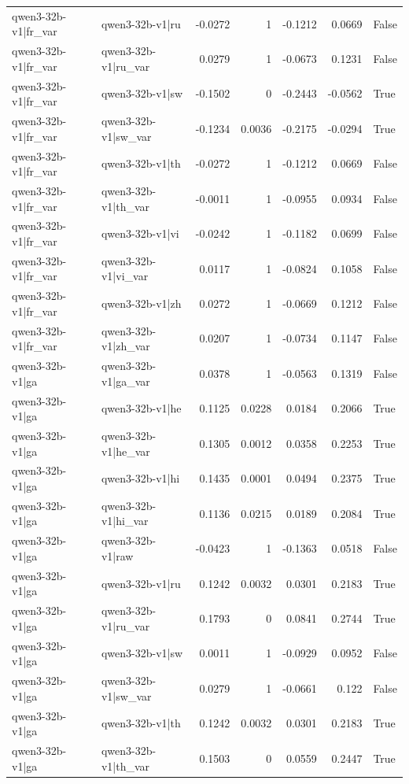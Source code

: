 \begin{table}
\begin{tabular}{l l r r r r l}
qwen3-32b-v1|fr_var & qwen3-32b-v1|ru & -0.0272 & 1 & -0.1212 & 0.0669 & False \\
qwen3-32b-v1|fr_var & qwen3-32b-v1|ru_var & 0.0279 & 1 & -0.0673 & 0.1231 & False \\
qwen3-32b-v1|fr_var & qwen3-32b-v1|sw & -0.1502 & 0 & -0.2443 & -0.0562 & True \\
qwen3-32b-v1|fr_var & qwen3-32b-v1|sw_var & -0.1234 & 0.0036 & -0.2175 & -0.0294 & True \\
qwen3-32b-v1|fr_var & qwen3-32b-v1|th & -0.0272 & 1 & -0.1212 & 0.0669 & False \\
qwen3-32b-v1|fr_var & qwen3-32b-v1|th_var & -0.0011 & 1 & -0.0955 & 0.0934 & False \\
qwen3-32b-v1|fr_var & qwen3-32b-v1|vi & -0.0242 & 1 & -0.1182 & 0.0699 & False \\
qwen3-32b-v1|fr_var & qwen3-32b-v1|vi_var & 0.0117 & 1 & -0.0824 & 0.1058 & False \\
qwen3-32b-v1|fr_var & qwen3-32b-v1|zh & 0.0272 & 1 & -0.0669 & 0.1212 & False \\
qwen3-32b-v1|fr_var & qwen3-32b-v1|zh_var & 0.0207 & 1 & -0.0734 & 0.1147 & False \\
qwen3-32b-v1|ga & qwen3-32b-v1|ga_var & 0.0378 & 1 & -0.0563 & 0.1319 & False \\
qwen3-32b-v1|ga & qwen3-32b-v1|he & 0.1125 & 0.0228 & 0.0184 & 0.2066 & True \\
qwen3-32b-v1|ga & qwen3-32b-v1|he_var & 0.1305 & 0.0012 & 0.0358 & 0.2253 & True \\
qwen3-32b-v1|ga & qwen3-32b-v1|hi & 0.1435 & 0.0001 & 0.0494 & 0.2375 & True \\
qwen3-32b-v1|ga & qwen3-32b-v1|hi_var & 0.1136 & 0.0215 & 0.0189 & 0.2084 & True \\
qwen3-32b-v1|ga & qwen3-32b-v1|raw & -0.0423 & 1 & -0.1363 & 0.0518 & False \\
qwen3-32b-v1|ga & qwen3-32b-v1|ru & 0.1242 & 0.0032 & 0.0301 & 0.2183 & True \\
qwen3-32b-v1|ga & qwen3-32b-v1|ru_var & 0.1793 & 0 & 0.0841 & 0.2744 & True \\
qwen3-32b-v1|ga & qwen3-32b-v1|sw & 0.0011 & 1 & -0.0929 & 0.0952 & False \\
qwen3-32b-v1|ga & qwen3-32b-v1|sw_var & 0.0279 & 1 & -0.0661 & 0.122 & False \\
qwen3-32b-v1|ga & qwen3-32b-v1|th & 0.1242 & 0.0032 & 0.0301 & 0.2183 & True \\
qwen3-32b-v1|ga & qwen3-32b-v1|th_var & 0.1503 & 0 & 0.0559 & 0.2447 & True \\

\end{tabular}
\end{table}
